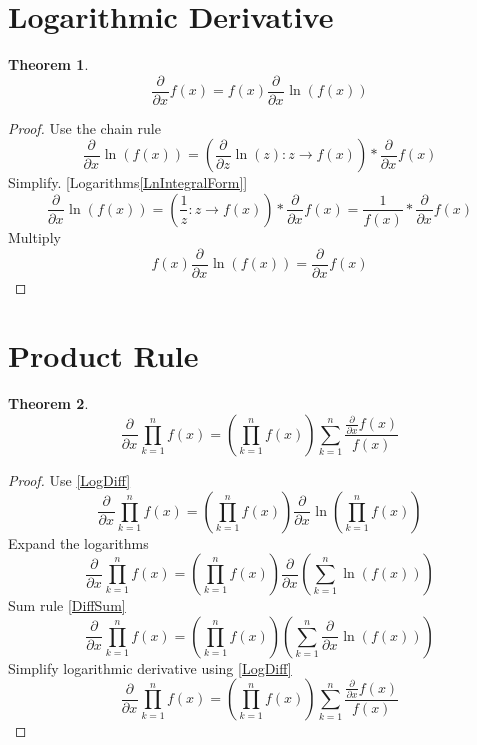 \documentclass[]{article}
\newcommand{\pqty}[1]{{\left(#1\right)}}
\newcommand{\pdiff}[2]{\frac{\partial^{#2}}{\partial #1^{#2}}}
\newtheorem{theorem}{Theorem}[section]
\numberwithin{equation}{section}
\begin{document}
	\section{Logarithmic Derivative}
	\begin{theorem}
		\begin{equation}
		\label{LogDiff}
		\pdiff{x}{}f\pqty{x}=f\pqty{x}\pdiff{x}{}\ln\pqty{f\pqty{x}}
		\end{equation}
	\end{theorem}
	\begin{proof}
		Use the chain rule
		\begin{equation}
		\pdiff{x}{}\ln\pqty{f\pqty{x}}=
		\pqty{\pdiff{z}{}\ln\pqty{z}:z\to f\pqty{x}}*\pdiff{x}{}{f\pqty{x}}
		\end{equation}
		Simplify. [Logarithms\eqref{LnIntegralForm}]
		\begin{equation}
		\pdiff{x}{}\ln\pqty{f\pqty{x}}=
		\pqty{\frac{1}{z}:z\to f\pqty{x}}*\pdiff{x}{}{f\pqty{x}}=
		\frac{1}{f\pqty{x}}*\pdiff{x}{}{f\pqty{x}}
		\end{equation}
		Multiply
		\begin{equation}
		f\pqty{x}\pdiff{x}{}\ln\pqty{f\pqty{x}}=
		\pdiff{x}{}{f\pqty{x}}
		\end{equation}
	\end{proof}

	\section{Product Rule}
	\begin{theorem}
		\begin{equation}
			\pdiff{x}{}\prod_{k=1}^{n}f\pqty{x}=
			\pqty{\prod_{k=1}^{n}f\pqty{x}}
			\sum_{k=1}^{n}\frac{\pdiff{x}{}f\pqty{x}}{f\pqty{x}}
		\end{equation}
	\end{theorem}
	\begin{proof}
		Use \eqref{LogDiff}
		\begin{equation}
		\pdiff{x}{}\prod_{k=1}^{n}f\pqty{x}=
		\pqty{\prod_{k=1}^{n}f\pqty{x}}\pdiff{x}{}\ln\pqty{\prod_{k=1}^{n}f\pqty{x}}
		\end{equation}
		Expand the logarithms
		\begin{equation}
		\pdiff{x}{}\prod_{k=1}^{n}f\pqty{x}=
		\pqty{\prod_{k=1}^{n}f\pqty{x}}
		\pdiff{x}{}\pqty{\sum_{k=1}^{n}\ln\pqty{f\pqty{x}}}
		\end{equation}
		Sum rule \eqref{DiffSum}
		\begin{equation}
		\pdiff{x}{}\prod_{k=1}^{n}f\pqty{x}=
		\pqty{\prod_{k=1}^{n}f\pqty{x}}
		\pqty{\sum_{k=1}^{n}\pdiff{x}{}\ln\pqty{f\pqty{x}}}
		\end{equation}
		Simplify logarithmic derivative using \eqref{LogDiff}
		\begin{equation}
		\pdiff{x}{}\prod_{k=1}^{n}f\pqty{x}=
		\pqty{\prod_{k=1}^{n}f\pqty{x}}
		{\sum_{k=1}^{n}\frac{\pdiff{x}{}f\pqty{x}}{f\pqty{x}}}
		\end{equation}
	\end{proof}
\end{document}
